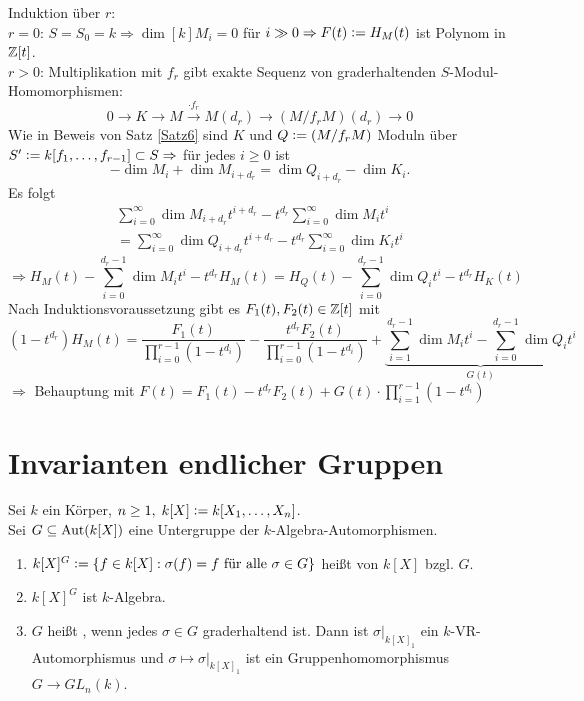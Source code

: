\documentclass[a4paper, 10pt]{report}
\begin{document}
\begin{Bew}
  Induktion über $r$:\\
  $r=0$: $S = S_0 = k \Rightarrow \dim[k]{M_i} = 0$ für $i \gg 0
  \Rightarrow F(t) \mathrel{\mathop:}= H_M(t)$ ist Polynom in $\mathbb{Z}[t]$.\\
  $r>0$: Multiplikation mit $f_r$ gibt exakte Sequenz von graderhaltenden
  $S$-Modul-Homomorphismen:
  $$ 0 \to K \to M \overset{\cdot f_r}{\to} M(d_r) \to (M/f_r M)(d_r) \to 0$$
  Wie in Beweis von Satz \ref{Satz6} sind $K$ und $Q \mathrel{\mathop:}= (M/f_r M)$ Moduln
  über $S' \mathrel{\mathop:}= k[f_1, \dots, f_{r-1}] \subset S \Rightarrow$ für jedes $i
  \ge 0$ ist
  \[
   -\dim{M_i} + \dim{M_{i + d_r}} = \dim{Q_{i+d_r}}-
  \dim{K_i}.
  \]
  Es folgt
  \begin{equation*}
  \begin{split}
  \sum_{i=0}^{\infty} \dim{M_{i+d_r}}t^{i+d_r} - t^{d_r}\sum_{i=0}^{\infty}
  \dim{M_i}t^i \\
   = \sum_{i=0}^{\infty} \dim{Q_{i+d_r}}t^{i+d_r} - t^{d_r}\sum_{i=0}^{\infty} \dim{K_i}t^i
  \end{split}
  \end{equation*}
  \[
  \Rightarrow H_M(t) - \sum_{i=0}^{d_r -1} \dim{M_i}t^i - t^{d_r} H_M(t)
  = H_Q(t) - \sum_{i=0}^{d_r - 1} \dim{Q_i}t^i - t^{d_r} H_K(t)
  \]
  Nach Induktionsvoraussetzung gibt es $F_1(t), F_2(t) \in \mathbb{Z}[t]$ mit
  \[
  (1-t^{d_r})H_M(t)= \frac{F_1(t)}{\displaystyle\prod_{i=0}^{r-1}(1-t^{d_i})}-
  \frac{t^{d_r} F_2(t)}{\displaystyle \prod_{i=0}^{r-1}(1-t^{d_i})} +
  \underset{G(t)}{\underbrace{\sum_{i=1}^{d_r-1} \dim{M_i}t^i -
  \sum_{i=0}^{d_r - 1} \dim{Q_i}t^i}}
  \]
  $\Rightarrow$ Behauptung mit $F(t) = F_1(t) - t^{d_r}F_2(t) + G(t)\cdot \displaystyle\prod_{i=1}^{r-1}(1-t^{d_i})$
\end{Bew}

\section{Invarianten endlicher Gruppen}

\begin{DefBem}
\label{2.19}
  Sei $k$ ein Körper, $n \ge 1, \; k[X] \mathrel{\mathop:}= k[X_1, \dots, X_n]$.\\
  Sei $G \subseteq \Aut{k[X]}$ eine Untergruppe der
  $k$-Algebra-Automorphismen.
  \begin{enumerate}
    \item $k[X]^G \mathrel{\mathop:}= \{f \in k[X]: \sigma (f) = f \text{ für alle } \sigma
          \in G\}$ heißt  von $k[X]$
          bzgl. $G$.
    \item $k[X]^G$ ist $k$-Algebra.
    \item $G$ heißt , wenn jedes $\sigma \in G$ graderhaltend ist. Dann
          ist $\sigma|_{k[X]_1}$ ein $k$-VR-Automorphismus und $\sigma \mapsto
          \sigma|_{k[X]_1}$ ist ein Gruppenhomomorphismus $G \to GL_n(k)$.
  \end{enumerate}
\end{DefBem}
\end{document}
